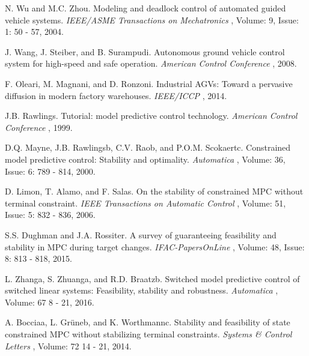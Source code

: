 \documentclass{ifacconf}
\begin{document}
 
\begin{thebibliography}{xx}  %

N. Wu and M.C. Zhou.
\newblock Modeling and deadlock control of automated guided vehicle systems.
\newblock \emph{ IEEE/ASME Transactions on Mechatronics }, Volume: 9, Issue: 1: 50 - 57, 2004.

J. Wang, J. Steiber, and B. Surampudi.
\newblock Autonomous ground vehicle control system for high-speed and safe operation.
\newblock \emph{ American Control Conference }, 2008.


F. Oleari, M. Magnani, and D. Ronzoni.
\newblock Industrial AGVs: Toward a pervasive diffusion in modern factory warehouses.
\newblock \emph{ IEEE/ICCP }, 2014.


J.B. Rawlings.
\newblock Tutorial: model predictive control technology.
\newblock \emph{  American Control Conference }, 1999.

D.Q. Mayne, J.B. Rawlingsb, C.V. Raob, and P.O.M. Scokaertc.
\newblock Constrained model predictive control: Stability and optimality.
\newblock \emph{  Automatica }, Volume: 36, Issue: 6: 789 - 814, 2000.

D. Limon, T. Alamo, and F. Salas.
\newblock On the stability of constrained MPC without terminal constraint.
\newblock \emph{   IEEE Transactions on Automatic Control }, Volume: 51, Issue: 5: 832 - 836, 2006.

S.S. Dughman and J.A. Rossiter.
\newblock A survey of guaranteeing feasibility and stability in MPC during target changes.
\newblock \emph{   IFAC-PapersOnLine }, Volume: 48, Issue: 8: 813 - 818, 2015.

L. Zhanga, S. Zhuanga, and R.D. Braatzb.
\newblock Switched model predictive control of switched linear systems:
Feasibility, stability and robustness.
\newblock \emph{  Automatica  }, Volume: 67 8 - 21, 2016.

A. Bocciaa, L. Grüneb, and K. Worthmannc.
\newblock Stability and feasibility of state constrained MPC without stabilizing terminal constraints.
\newblock \emph{  Systems & Control Letters  }, Volume: 72 14 - 21, 2014.




\end{thebibliography}
\end{document}
